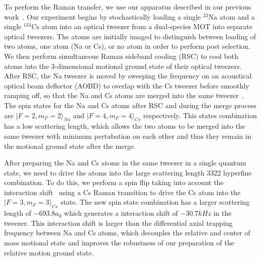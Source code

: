 \documentclass[aps,prl,twocolumn,groupedaddress]{revtex4-1}
\newcommand{\todo}[1]{}
\begin{document}
To perform the Raman transfer, we use our apparatus described in our previous work~\cite{Liu2019}. Our experiment begins by stochastically loading a single ${}^{23}\mathrm{Na}$ atom and a single ${}^{133}\mathrm{Cs}$ atom into an optical tweezer from a dual-species MOT\todo{cite na loading paper} into separate optical tweezers. The atoms are initially imaged to distinguish between loading of two atoms, one atom (Na or Cs), or no atom in order to perform post selection. We then perform simultaneous Raman sideband cooling (RSC) to cool both atoms into the 3-dimensional motional ground state of their optical tweezers. After RSC, the Na tweezer is moved by sweeping the frequency on an acoustical optical beam deflector (AOBD) to overlap with the Cs tweezer before smoothly ramping off, so that the Na and Cs atoms are merged into the same tweezer~\cite{Liu2019}. The spin states for the Na and Cs atoms after RSC and during the merge process are $|F=2,m_F=2\rangle_{Na}$ and $|F=4,m_F=4\rangle_{Cs}$ respectively. This states combination has a low scattering length, which allows the two atoms to be merged into the same tweezer with minimum pertubation on each other and thus they remain in the motional ground state after the merge.

After preparing the Na and Cs atoms in the same tweezer in a single quantum state, we need to drive the atoms into the large scattering length 3322 hyperfine combination. To do this, we perform a spin flip taking into account the interaction shift~\cite{Hood2019} using a Cs Raman transition to drive the Cs atom into the $|F=3,m_F=3\rangle_{Cs}$ state. The new spin state combination has a larger scattering length of $-693.8 a_0$ which generates a interaction shift of $-30.7 kHz$ in the tweezer. This interaction shift is larger than the differential axial trapping frequency between Na and Cs atoms, which decouples the relative and center of mass motional state and improves the robustness of our preparation of the relative motion ground state.

\end{document}
